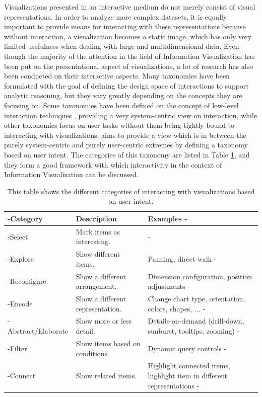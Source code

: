Visualizations presented in an interactive medium do not merely consist of visual representations.
In order to analyze more complex datasets, it is equally important to provide means for interacting with these representations because without interaction, a visualization becomes a static image, which has only very limited usefulness when dealing with large and multidimensional data.
Even though the majority of the attention in the field of Information Visualization has been put on the presentational aspect of visualizations, a lot of research has also been conducted on their interactive aspects.
Many taxonomies have been formulated with the goal of defining the design space of interactions to support analytic reasoning, but they vary greatly depending on the concepts they are focusing on.
Some taxonomies have been defined on the concept of low-level interaction techniques \parencite{TheEyesHaveIt,GrammarOfGraphics}, providing a very system-centric view on interaction, while other taxonomies focus on user tasks \parencite{LowLevelComponentsOfAnalyticActivity} without them being tightly bound to interacting with visualizations.
\cite{RoleOfInteractionInInformationVisualization} aims to provide a view which is in between the purely system-centric and purely user-centric extremes by defining a taxonomy based on user intent.
The categories of this taxonomy are listed in Table \ref{tab:UserIntentCategories}, and they form a good framework with which interactivity in the context of Information Visualization can be discussed.

\begin{table}[tp]
\tablestretch
{}
\centering
\begin{tabularx}{\linewidth}{>{\kern-\tabcolsep}lXX<{\kern-\tabcolsep}}
\toprule
Category & Description & Examples \\
\midrule
Select & Mark items as interesting. & \\
Explore & Show different items. & Panning, direct-walk \\
Reconfigure & Show a different arrangement. & Dimension configuration, position adjustments \\
Encode & Show a different representation. & Change chart type, orientation, colors, shapes, ... \\
Abstract/Elaborate & Show more or less detail. & Details-on-demand (drill-down, sunburst, tooltips, zooming) \\
Filter & Show items based on conditions. & Dynamic query controls \\
Connect & Show related items. & Highlight connected items, highlight item in different representations \\
\bottomrule
\end{tabularx}
\caption[Categories of Interaction Based on User Intent]{
  This table shows the different categories of interacting with visualizations based on user intent.
}
\label{tab:UserIntentCategories}
\end{table}



